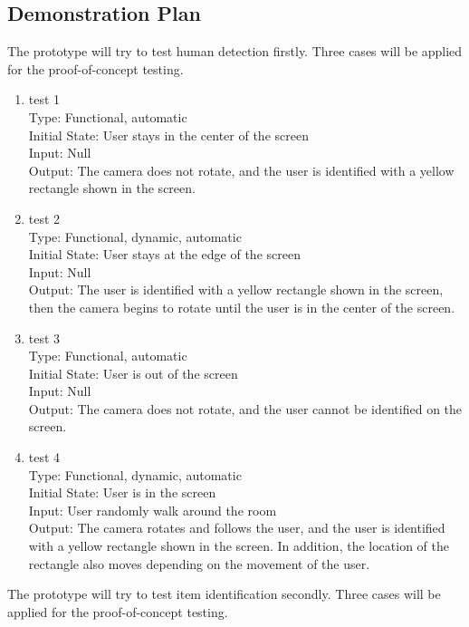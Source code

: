 \documentclass[12pt, titlepage]{article}
\begin{document}
\subsection{Demonstration Plan}
The prototype will try to test human detection firstly. Three cases will be applied for the proof-of-concept testing.
\begin{enumerate}
\item{test 1\\}
Type: Functional, automatic\\
Initial State: User stays in the center of the screen\\
Input: Null\\
Output: The camera does not rotate, and the user is identified with a yellow rectangle shown in the screen.\\			
\item{test 2\\}
Type: Functional, dynamic, automatic\\
Initial State: User stays at the edge of the screen\\
Input: Null\\
Output: The user is identified with a yellow rectangle shown in the screen, then the camera begins to rotate until the user is in the center of the screen.\\
\item{test 3\\}
Type: Functional, automatic\\
Initial State: User is out of the screen\\
Input: Null\\
Output: The camera does not rotate, and the user cannot be identified on the screen.\\
\item{test 4\\}
Type: Functional, dynamic, automatic\\
Initial State: User is in the screen\\
Input: User randomly walk around the room\\
Output: The camera rotates and follows the user, and the user is identified with a yellow rectangle shown in the screen. In addition, the location of the rectangle also moves depending on the movement of the user.\\
\end{enumerate}
The prototype will try to test item identification secondly. Three cases will be applied for the proof-of-concept testing.
\end{document}
